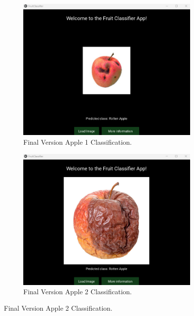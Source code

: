 \documentclass[conference]{IEEEtran}
\begin{document}
\begin{figure}[h]
    \centering
    \begin{subfigure}[b]{0.48\linewidth}
        \centering
        \includegraphics[width=\linewidth]{Mlayer appelR1.png}
        \caption{Final Version Apple 1 Classification.}
        \label{figFA}
    \end{subfigure}
    \hfill
    \begin{subfigure}[b]{0.48\linewidth}
        \centering
        \includegraphics[width=\linewidth]{Mlayer appelR2.png}
        \caption{Final Version Apple 2 Classification.}
        \label{figFB}
    \end{subfigure}

\end{figure}
\end{document}
